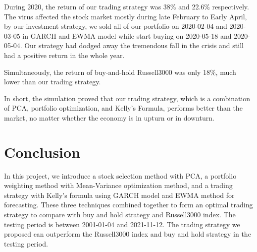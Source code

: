 \documentclass[11pts]{article}
\begin{document}
During 2020, the return of our trading strategy was 38\% and 22.6\% respectively. The virus affected the stock market mostly during late February to Early April, by our investment strategy, we sold all of our portfolio on 2020-02-04 and 2020-03-05 in GARCH and EWMA model while start buying on 2020-05-18 and 2020-05-04. Our strategy had dodged away the tremendous fall in the crisis and still had a positive return in the whole year.


Simultaneously, the return of buy-and-hold Russell3000 was only 18\%, much lower than our trading strategy.


In short, the simulation proved that our trading strategy, which is a combination of PCA, portfolio optimization, and Kelly's Formula, performs better than the market, no matter whether the economy is in upturn or in downturn.
\section{Conclusion}
\label{sec:orgeda675c}
In this project, we introduce a stock selection method with PCA, a portfolio weighting method with Mean-Variance optimization method, and a trading strategy with Kelly's formula using GARCH model and EWMA method for forecasting. These three techniques combined together to form an optimal trading strategy to compare with buy and hold strategy and Russell3000 index. The testing period is between 2001-01-04 and 2021-11-12. The trading strategy we proposed can outperform the Russell3000 index and buy and hold strategy in the testing period.
\end{document}
